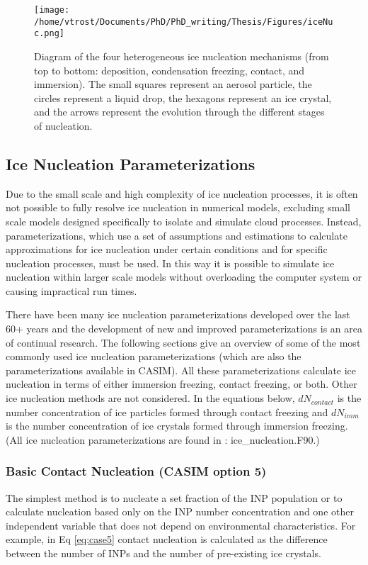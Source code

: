 \begin{figure}[h]
	\centering
	\texttt{[image: /home/vtrost/Documents/PhD/PhD\_writing/Thesis/Figures/iceNuc.png]}
	\caption{Diagram of the four heterogeneous ice nucleation mechanisms (from top to bottom: deposition, condensation freezing, contact, and immersion). The small squares represent an aerosol particle, the circles represent a liquid drop, the hexagons represent an ice crystal, and the arrows represent the evolution through the different stages of nucleation. \citep[][Figure 9.1]{rog1989}}
	\label{fig:iceNuc}
\end{figure}

\subsection{Ice Nucleation Parameterizations}
Due to the small scale and high complexity of ice nucleation processes, it is often not possible to fully resolve ice nucleation in numerical models, excluding small scale models designed specifically to isolate and simulate cloud processes. Instead, parameterizations, which use a set of assumptions and estimations to calculate approximations for ice nucleation under certain conditions and for specific nucleation processes, must be used. In this way it is possible to simulate ice nucleation within larger scale models without overloading the computer system or causing impractical run times. 

There have been many ice nucleation parameterizations developed over the last 60+ years and the development of new and improved parameterizations is an area of continual research. The following sections give an overview of some of the most commonly used ice nucleation parameterizations (which are also the parameterizations available in CASIM). All these parameterizations calculate ice nucleation in terms of either immersion freezing, contact freezing, or both. Other ice nucleation methods are not considered. In the equations below, $dN_{contact}$ is the number concentration of ice particles formed through contact freezing and $dN_{imm}$ is the number concentration of ice crystals formed through immersion freezing. (All ice nucleation parameterizations are found in \cite{casimCode}: ice\_nucleation.F90.)

\subsubsection{Basic Contact Nucleation (CASIM option 5)}
The simplest method is to nucleate a set fraction of the INP population or to calculate nucleation based only on the INP number concentration and one other independent variable that does not depend on environmental characteristics. For example, in Eq \ref{eq:case5} contact nucleation is calculated as the difference between the number of INPs and the number of pre-existing ice crystals.

